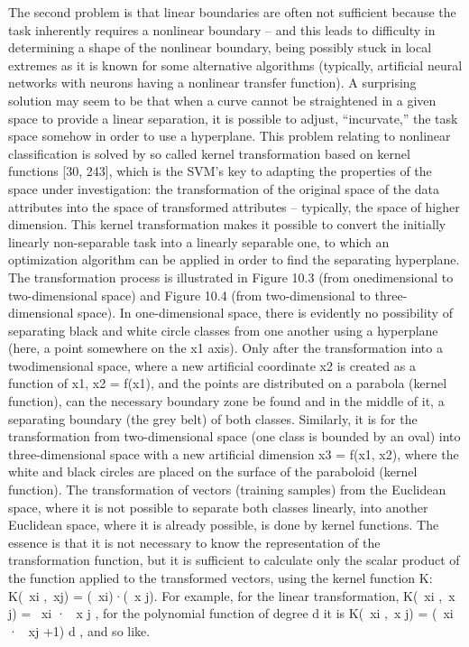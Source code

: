 \documentclass[11pt,openany,executivepaper]{book}
\begin{document}
The second problem is that linear boundaries are often not sufficient because
the task inherently requires a nonlinear boundary – and this leads to difficulty in
determining a shape of the nonlinear boundary, being possibly stuck in local extremes as it is known for some alternative algorithms (typically, artificial neural
networks with neurons having a nonlinear transfer function). A surprising solution may seem to be that when a curve cannot be straightened in a given space
to provide a linear separation, it is possible to adjust, “incurvate,” the task space
somehow in order to use a hyperplane.
This problem relating to nonlinear classification is solved by so called kernel
transformation based on kernel functions [30, 243], which is the SVM’s key to
adapting the properties of the space under investigation: the transformation of
the original space of the data attributes into the space of transformed attributes
– typically, the space of higher dimension. This kernel transformation makes it
possible to convert the initially linearly non-separable task into a linearly separable one, to which an optimization algorithm can be applied in order to find the
separating hyperplane.
The transformation process is illustrated in Figure 10.3 (from onedimensional to two-dimensional space) and Figure 10.4 (from two-dimensional
to three-dimensional space).
In one-dimensional space, there is evidently no possibility of separating
black and white circle classes from one another using a hyperplane (here, a
point somewhere on the x1 axis). Only after the transformation into a twodimensional space, where a new artificial coordinate x2 is created as a function
of x1, x2 = f(x1), and the points are distributed on a parabola (kernel function),
can the necessary boundary zone be found and in the middle of it, a separating
boundary (the grey belt) of both classes.
Similarly, it is for the transformation from two-dimensional space (one class
is bounded by an oval) into three-dimensional space with a new artificial dimension x3 = f(x1, x2), where the white and black circles are placed on the surface
of the paraboloid (kernel function).
The transformation of vectors (training samples) from the Euclidean space,
where it is not possible to separate both classes linearly, into another Euclidean
space, where it is already possible, is done by kernel functions. The essence
is that it is not necessary to know the representation of the  transformation
function, but it is sufficient to calculate only the scalar product of the  function
applied to the transformed vectors, using the kernel function K:
K(~xi
,~xj) = (~xi)·(~x j).
For example, for the linear transformation, K(~xi
,~x j) =~ xi
·~ x j
, for the polynomial
function of degree d it is K(~xi
,~x j) = (~xi
·~ xj +1)
d
, and so like.
\end{document}
